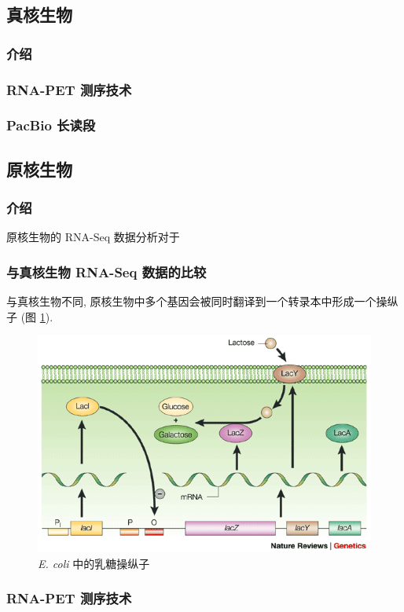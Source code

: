 \subsection{真核生物}

\subsubsection{介绍} %

\subsubsection{RNA-PET 测序技术} %

\subsubsection{PacBio 长读段} %

\subsection{原核生物}

\subsubsection{介绍} %
原核生物的 RNA-Seq 数据分析对于

\subsubsection{与真核生物 RNA-Seq 数据的比较} %
与真核生物不同, 原核生物中多个基因会被同时翻译到一个转录本中形成一个操纵子 
(图 \ref{e.coli.lactose.operon}).

\begin{figure}[!t]
\centering
\includegraphics[width=\textwidth]{figures/disc/e-coli-lactose-operon.png}
\caption{\textit{E. coli} 中的乳糖操纵子 \cite{shuman2003art}}
\label{e.coli.lactose.operon}
\end{figure}

\subsubsection{RNA-PET 测序技术} %





